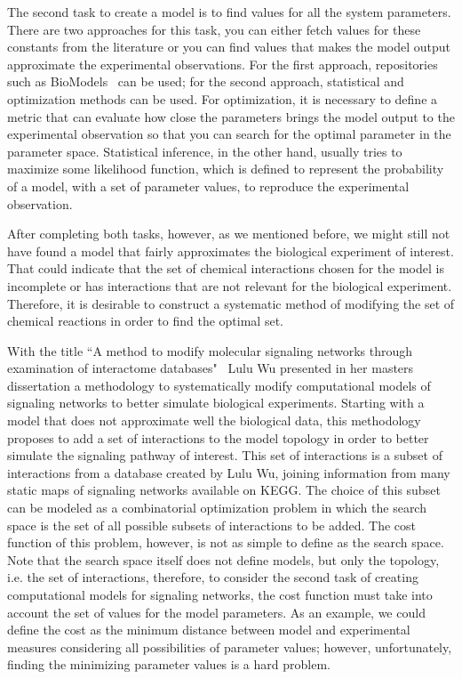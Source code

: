 The second task to create a model is to find values for all the system
parameters. There are two approaches for this task, you can either 
fetch values for these constants from the literature or you can find 
values that makes the model output approximate the experimental 
observations. For the first approach, repositories such as 
BioModels~\cite{le2006biomodels} can be used; for the second approach, 
statistical and optimization methods can be used. For optimization, it 
is necessary to define a metric that can evaluate how close the 
parameters brings the model output to the experimental observation so
that you can search for the optimal parameter in the parameter space. 
Statistical inference, in the other hand, usually tries to maximize some 
likelihood function, which is defined to represent the probability of a 
model, with a set of parameter values, to reproduce the experimental 
observation.

After completing both tasks, however, as we mentioned before, we might 
still not have found a model that fairly approximates the biological 
experiment of interest. That could indicate that the set of chemical 
interactions chosen for the model is incomplete or has interactions that
are not relevant for the biological experiment. Therefore, it is 
desirable to construct a systematic method of modifying the set of 
chemical reactions in order to find the optimal set.

With the title ``A method to modify molecular signaling networks through
examination of interactome databases"~\cite{Wu15} Lulu Wu presented in 
her masters dissertation a methodology to systematically modify 
computational models of signaling networks to better simulate biological 
experiments. Starting with a model that does not approximate well the 
biological data, this methodology proposes to add a set of interactions
to the model topology in order to better simulate the signaling pathway 
of interest. This set of interactions is a subset of interactions from a 
database created by Lulu Wu, joining information from many static maps 
of signaling networks available on KEGG. The choice of this subset can 
be modeled as a combinatorial optimization problem in which the search 
space is the set of all possible subsets of interactions to be added.
The cost function of this problem, however, is not as simple to define 
as the search space. Note that the search space itself does not define 
models, but only the topology, i.e. the set of interactions, therefore, 
to consider the second task of creating computational models for 
signaling networks, the cost function must take into account the set of 
values for the model parameters. As an example, we could define the cost 
as the minimum distance between model and experimental measures 
considering all possibilities of parameter values; however, 
unfortunately, finding the minimizing parameter values is a hard 
problem.

